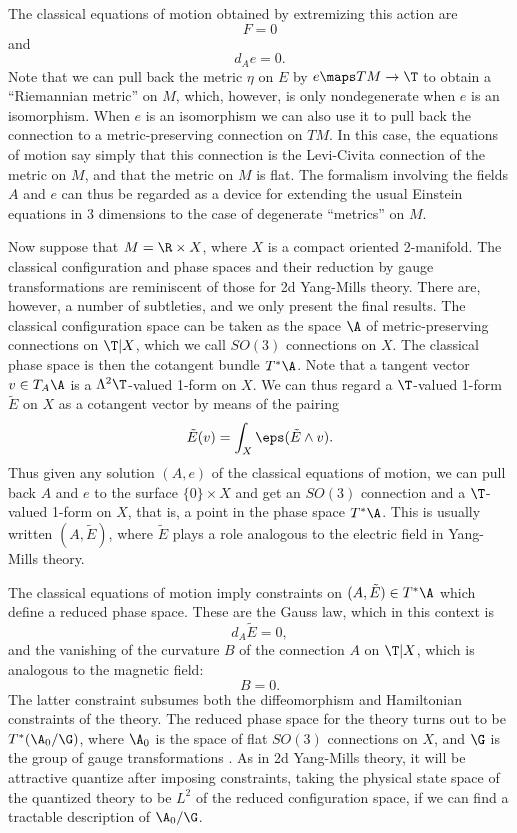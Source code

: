 The classical equations of motion obtained by extremizing this action are
\[            F = 0 \]
and
\[            d_A e = 0 .\]
Note that we can pull back the metric $\eta$ on $E$ by $e \maps TM \to \T$
to obtain a ``Riemannian metric'' on $M$, which, however, is only
nondegenerate when $e$ is an isomorphism.  When $e$ is an isomorphism we
can also use it to pull back the connection to a metric-preserving
connection on $TM$.  In this case, the equations of motion say simply that
this connection is the Levi-Civita connection of the metric on $M$,
and that the metric on $M$ is flat.
The formalism involving the fields $A$ and $e$ can thus be regarded as a
device for extending the usual Einstein equations in 3 dimensions to the
case of degenerate ``metrics'' on $M$.

Now suppose that $M = \R \times X$, where $X$ is a compact oriented
2-manifold.  The classical configuration and phase spaces and their
reduction by gauge transformations are reminiscent of those for 2d
Yang-Mills theory.  There are, however, a number of subtleties, and we
only present the final results.   The
classical configuration space can be taken as the space $\A$ of
metric-preserving connections on $\T|X$, which we call $SO(3)$ connections
on $X$.  The classical phase space is then the cotangent bundle $T^\ast \A$.
Note that a tangent vector $v \in T_A\A$ is a
$\Lambda^2 \T$-valued 1-form on $X$.  We can thus regard a $\T$-valued
1-form $\tilde E$ on $X$ as a cotangent vector by means of the pairing
\[         \tilde E(v) = \int_X \eps(\tilde E \wedge v) .\]
Thus given any solution $(A,e)$ of the
classical equations of motion, we can pull back $A$
and $e$ to the surface $\{0\} \times X$ and get an $SO(3)$ connection and a
$\T$-valued 1-form on $X$, that is, a point in the phase space $T^\ast \A$.
This is usually written $(A,\tilde E)$, where $\tilde E$ plays a role
analogous to the electric field in Yang-Mills theory.

The classical equations of motion imply constraints on
$(A,\tilde E) \in T^\ast \A$ which define a reduced phase space.
These are the Gauss law, which in this context is
\[   d_A \tilde E = 0,\]
and the vanishing of the curvature $B$ of the connection $A$ on $\T|X$,
which is analogous to the magnetic field:
\[     B = 0.\]
The latter constraint subsumes both the diffeomorphism and Hamiltonian
constraints of the theory.
The reduced phase space for the theory turns out to be
 $T^\ast(\A_0/\G)$, where $\A_0$ is the
space of flat $SO(3)$ connections on $X$, and $\G$ is the group of
gauge transformations \cite{AHRSS}.
As in 2d Yang-Mills theory, it will be attractive quantize after
imposing constraints, taking the physical state space of the
quantized theory to be $L^2$ of the reduced configuration space, if we can
find a tractable description of $\A_0/\G$.

